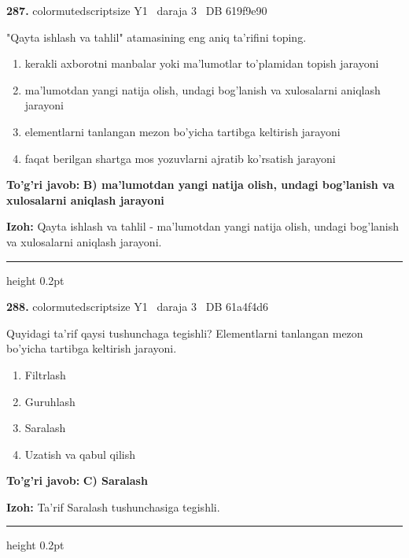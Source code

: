 \documentclass[10pt,a4paper,oneside]{article}
\begin{document}
\noindent\textbf{\color{ink}287.}  {color{muted}scriptsize Y1 \textbullet\ daraja 3 \textbullet\ DB 619f9e90}
\par
"Qayta ishlash va tahlil" atamasining eng aniq ta'rifini toping.
\begin{enumerate}[label=\Alph*),leftmargin=9mm]
\item kerakli axborotni manbalar yoki ma'lumotlar to'plamidan topish jarayoni
\item ma'lumotdan yangi natija olish, undagi bog'lanish va xulosalarni aniqlash jarayoni
\item elementlarni tanlangan mezon bo'yicha tartibga keltirish jarayoni
\item faqat berilgan shartga mos yozuvlarni ajratib ko'rsatish jarayoni
\end{enumerate}
\begin{tcolorbox}[enhanced,breakable,colback=teal!4,colframe=teal!50!black,boxrule=0.5pt,arc=1.1mm,left=3mm,right=3mm,top=1.7mm,bottom=1.7mm,before skip=2mm,after skip=2mm]
\textbf{\color{teal}To'g'ri javob:} \textbf{B) ma'lumotdan yangi natija olish, undagi bog'lanish va xulosalarni aniqlash jarayoni}
\par\smallskip
\textbf{Izoh:} Qayta ishlash va tahlil - ma'lumotdan yangi natija olish, undagi bog'lanish va xulosalarni aniqlash jarayoni.
\end{tcolorbox}
\vspace{2mm}\hrule height 0.2pt \vspace{3mm}

\noindent\textbf{\color{ink}288.}  {color{muted}scriptsize Y1 \textbullet\ daraja 3 \textbullet\ DB 61a4f4d6}
\par
Quyidagi ta'rif qaysi tushunchaga tegishli? Elementlarni tanlangan mezon bo'yicha tartibga keltirish jarayoni.
\begin{enumerate}[label=\Alph*),leftmargin=9mm]
\item Filtrlash
\item Guruhlash
\item Saralash
\item Uzatish va qabul qilish
\end{enumerate}
\begin{tcolorbox}[enhanced,breakable,colback=teal!4,colframe=teal!50!black,boxrule=0.5pt,arc=1.1mm,left=3mm,right=3mm,top=1.7mm,bottom=1.7mm,before skip=2mm,after skip=2mm]
\textbf{\color{teal}To'g'ri javob:} \textbf{C) Saralash}
\par\smallskip
\textbf{Izoh:} Ta'rif Saralash tushunchasiga tegishli.
\end{tcolorbox}
\vspace{2mm}\hrule height 0.2pt \vspace{3mm}
\end{document}
